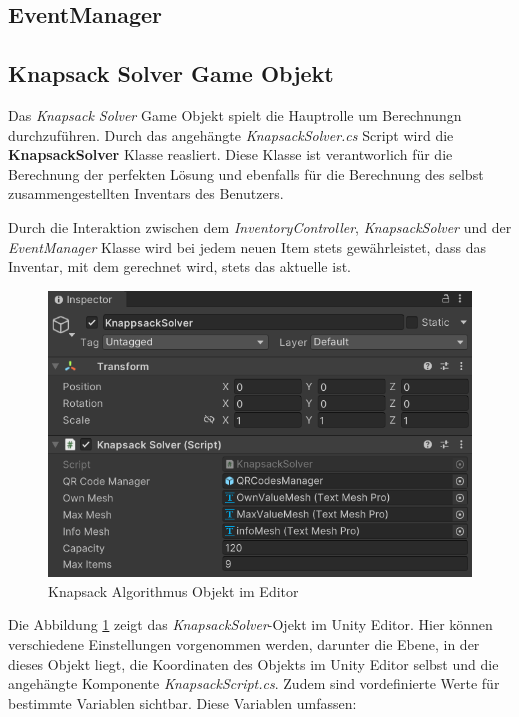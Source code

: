 \subsection{EventManager}

\subsection{Knapsack Solver Game Objekt}
Das \textit{Knapsack Solver} Game Objekt spielt die Hauptrolle um Berechnungn durchzuführen.
Durch das angehängte \textit{KnapsackSolver.cs} Script wird die \textbf{KnapsackSolver} Klasse reasliert. Diese
Klasse ist verantworlich für die Berechnung der perfekten Lösung und ebenfalls für die Berechnung des selbst
zusammengestellten Inventars des Benutzers.

Durch die Interaktion zwischen dem \textit{InventoryController}, \textit{KnapsackSolver} und der
\textit{EventManager} Klasse wird bei jedem neuen Item stets gewährleistet, dass das Inventar, mit dem gerechnet wird, stets das aktuelle ist.\\

\begin{figure}[h]
\centering
\includegraphics[scale=0.8]{images/knapsackEditor}
\caption{Knapsack Algorithmus Objekt im Editor}
\label{fig:Knapsack_Editor}
\end{figure}

Die Abbildung \ref{fig:Knapsack_Editor} zeigt das \textit{KnapsackSolver}-Ojekt im Unity Editor. Hier können verschiedene
Einstellungen vorgenommen werden, darunter die Ebene, in der dieses Objekt liegt, die Koordinaten des Objekts im
Unity Editor selbst und die angehängte Komponente \textit{KnapsackScript.cs}. Zudem sind vordefinierte Werte für
bestimmte Variablen sichtbar. Diese Variablen umfassen:

